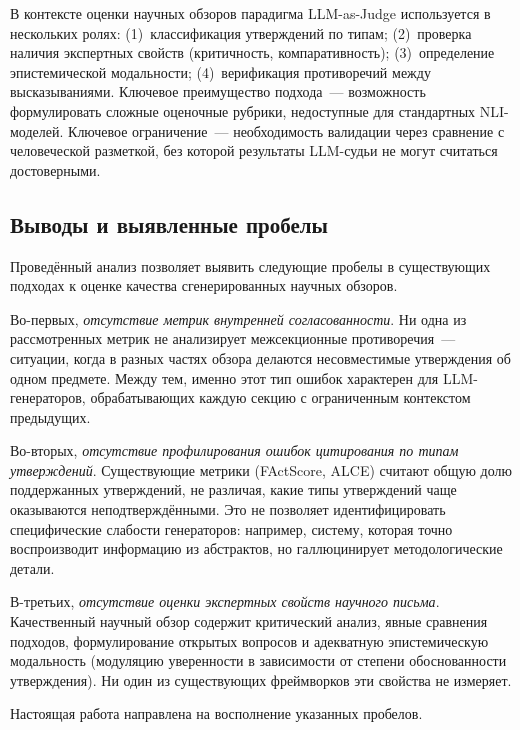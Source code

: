 \documentclass[a4paper,14pt]{extarticle}
\begin{document}
В контексте оценки научных обзоров парадигма LLM-as-Judge используется в нескольких ролях: (1)~классификация утверждений по типам; (2)~проверка наличия экспертных свойств (критичность, компаративность); (3)~определение эпистемической модальности; (4)~верификация противоречий между высказываниями. Ключевое преимущество подхода~--- возможность формулировать сложные оценочные рубрики, недоступные для стандартных NLI-моделей. Ключевое ограничение~--- необходимость валидации через сравнение с человеческой разметкой, без которой результаты LLM-судьи не могут считаться достоверными.


\subsection{Выводы и выявленные пробелы}

Проведённый анализ позволяет выявить следующие пробелы в существующих подходах к оценке качества сгенерированных научных обзоров.

Во-первых, \emph{отсутствие метрик внутренней согласованности}. Ни одна из рассмотренных метрик не анализирует межсекционные противоречия~--- ситуации, когда в разных частях обзора делаются несовместимые утверждения об одном предмете. Между тем, именно этот тип ошибок характерен для LLM-генераторов, обрабатывающих каждую секцию с ограниченным контекстом предыдущих.

Во-вторых, \emph{отсутствие профилирования ошибок цитирования по типам утверждений}. Существующие метрики (FActScore, ALCE) считают общую долю поддержанных утверждений, не различая, какие типы утверждений чаще оказываются неподтверждёнными. Это не позволяет идентифицировать специфические слабости генераторов: например, систему, которая точно воспроизводит информацию из абстрактов, но галлюцинирует методологические детали.

В-третьих, \emph{отсутствие оценки экспертных свойств научного письма}. Качественный научный обзор содержит критический анализ, явные сравнения подходов, формулирование открытых вопросов и адекватную эпистемическую модальность (модуляцию уверенности в зависимости от степени обоснованности утверждения). Ни один из существующих фреймворков эти свойства не измеряет.

Настоящая работа направлена на восполнение указанных пробелов.


\newpage

\end{document}
